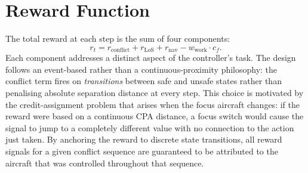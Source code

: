\documentclass[11pt, a4paper]{article}
\begin{document}
\section{Reward Function}
\label{sec:reward}

The total reward at each step is the sum of four components:
\begin{equation}
    r_t = r_\text{conflict} + r_\text{LoS} + r_\text{nav} - w_\text{work}\cdot c_f.
    \label{eq:reward_total}
\end{equation}
Each component addresses a distinct aspect of the controller's task.
The design follows an event-based rather than a continuous-proximity
philosophy: the conflict term fires on \emph{transitions} between safe and
unsafe states rather than penalising absolute separation distance at every
step.
This choice is motivated by the credit-assignment problem that arises when the
focus aircraft changes: if the reward were based on a continuous CPA distance,
a focus switch would cause the signal to jump to a completely different value
with no connection to the action just taken.
By anchoring the reward to discrete state transitions, all reward signals for
a given conflict sequence are guaranteed to be attributed to the aircraft that
was controlled throughout that sequence.
\end{document}
